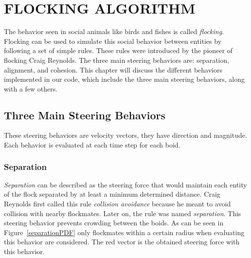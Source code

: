 \chapter{FLOCKING ALGORITHM}\label{chap3}

The behavior seen in social animals like birds and fishes is called \textit{flocking}. Flocking can be used to simulate this social behavior between entities by following a set of simple rules. These rules were introduced by the pioneer of flocking Craig Reynolds\cite{craig1}. The three main steering behaviors are: separation, alignment, and cohesion. This chapter will discuss the different behaviors implemented in our code, which include the three main steering behaviors, along with a few others.

\section{Three Main Steering Behaviors}
These steering behaviors are velocity vectors, they have direction and magnitude. Each behavior is evaluated at each time step for each boid.

\subsection{Separation}\label{separationsection}
\textit{Separation} can be described as the steering force that would maintain each entity of the flock separated by at least a minimum determined distance. Craig Reynolds first called this rule \textit{collision avoidance} because he meant to avoid collision with nearby flockmates. Later on, the rule was named \textit{separation}. This steering behavior prevents crowding between the boids. As can be seen in Figure~\ref{separationPDF} only flockmates within a certain radius when evaluating this behavior are considered. The red vector is the obtained steering force with this behavior.

